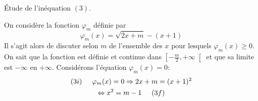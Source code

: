 \begin{center}
\'Etude de l'inéquation $(3)$.  
\end{center}
On considère la fonction $\varphi_m$ définie par
\begin{displaymath}
 \varphi_m(x) = \sqrt{2x+m} - (x+1)
\end{displaymath}
Il s'agit alors de discuter selon $m$ de l'ensemble des $x$ pour lesquels $\varphi_m(x)\geq 0$.\newline
On sait que la fonction est définie et continue dans $\left[ -\frac{m}{2},+\infty\right[$ et  que sa limite est $-\infty$ en $+\infty$.\newline
Considérons l'équation $\varphi_m(x)= 0$:
\begin{multline*}
 (3i)\hspace{0.5cm} \varphi_m(x)= 0 \Rightarrow 2x+m = (x+1)^2 \\
 \Leftrightarrow x^2 = m-1 \hspace{0.5cm} (3f)
\end{multline*}
